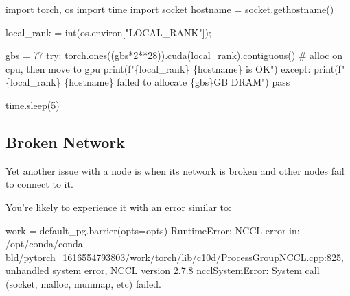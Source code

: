 \documentclass[
]{report}
\newenvironment{Shaded}{\begin{snugshade}}{\end{snugshade}}
\newcommand{\BuiltInTok}[1]{\textcolor[rgb]{0.00,0.23,0.31}{#1}}
\newcommand{\CommentTok}[1]{\textcolor[rgb]{0.37,0.37,0.37}{#1}}
\newcommand{\ControlFlowTok}[1]{\textcolor[rgb]{0.00,0.23,0.31}{#1}}
\newcommand{\DecValTok}[1]{\textcolor[rgb]{0.68,0.00,0.00}{#1}}
\newcommand{\ErrorTok}[1]{\textcolor[rgb]{0.68,0.00,0.00}{#1}}
\newcommand{\ExtensionTok}[1]{\textcolor[rgb]{0.00,0.23,0.31}{#1}}
\newcommand{\ImportTok}[1]{\textcolor[rgb]{0.00,0.46,0.62}{#1}}
\newcommand{\KeywordTok}[1]{\textcolor[rgb]{0.00,0.23,0.31}{#1}}
\newcommand{\NormalTok}[1]{\textcolor[rgb]{0.00,0.23,0.31}{#1}}
\newcommand{\OperatorTok}[1]{\textcolor[rgb]{0.37,0.37,0.37}{#1}}
\newcommand{\SpecialCharTok}[1]{\textcolor[rgb]{0.37,0.37,0.37}{#1}}
\newcommand{\SpecialStringTok}[1]{\textcolor[rgb]{0.13,0.47,0.30}{#1}}
\newcommand{\StringTok}[1]{\textcolor[rgb]{0.13,0.47,0.30}{#1}}
\newcommand{\VariableTok}[1]{\textcolor[rgb]{0.07,0.07,0.07}{#1}}
\begin{document}
\begin{Shaded}
\begin{Highlighting}[]
\ImportTok{import}\NormalTok{ torch, os}
\ImportTok{import}\NormalTok{ time}
\ImportTok{import}\NormalTok{ socket}
\NormalTok{hostname }\OperatorTok{=}\NormalTok{ socket.gethostname()}

\NormalTok{local\_rank }\OperatorTok{=} \BuiltInTok{int}\NormalTok{(os.environ[}\StringTok{"LOCAL\_RANK"}\NormalTok{])}\OperatorTok{;}

\NormalTok{gbs }\OperatorTok{=} \DecValTok{77}
\ControlFlowTok{try}\NormalTok{:}
\NormalTok{    torch.ones((gbs}\OperatorTok{*}\DecValTok{2}\OperatorTok{**}\DecValTok{28}\NormalTok{)).cuda(local\_rank).contiguous() }\CommentTok{\# alloc on cpu, then move to gpu}
    \BuiltInTok{print}\NormalTok{(}\SpecialStringTok{f"}\SpecialCharTok{\{}\NormalTok{local\_rank}\SpecialCharTok{\}}\SpecialStringTok{ }\SpecialCharTok{\{}\NormalTok{hostname}\SpecialCharTok{\}}\SpecialStringTok{ is OK"}\NormalTok{)}
\ControlFlowTok{except}\NormalTok{:}
    \BuiltInTok{print}\NormalTok{(}\SpecialStringTok{f"}\SpecialCharTok{\{}\NormalTok{local\_rank}\SpecialCharTok{\}}\SpecialStringTok{ }\SpecialCharTok{\{}\NormalTok{hostname}\SpecialCharTok{\}}\SpecialStringTok{ failed to allocate }\SpecialCharTok{\{}\NormalTok{gbs}\SpecialCharTok{\}}\SpecialStringTok{GB DRAM"}\NormalTok{)}
    \ControlFlowTok{pass}

\NormalTok{time.sleep(}\DecValTok{5}\NormalTok{)}
\end{Highlighting}
\end{Shaded}

\subsection{Broken Network}\label{broken-network}

Yet another issue with a node is when its network is broken and other
nodes fail to connect to it.

You're likely to experience it with an error similar to:

\begin{Shaded}
\begin{Highlighting}[]
\ExtensionTok{work}\NormalTok{ = default\_pg.barrier}\ErrorTok{(}\VariableTok{opts}\OperatorTok{=}\NormalTok{opts}\KeywordTok{)}
\ExtensionTok{RuntimeError:}\NormalTok{ NCCL error in: /opt/conda/conda{-}bld/pytorch\_1616554793803/work/torch/lib/c10d/ProcessGroupNCCL.cpp:825, unhandled system error, NCCL version 2.7.8}
\ExtensionTok{ncclSystemError:}\NormalTok{ System call }\ErrorTok{(}\ExtensionTok{socket,}\NormalTok{ malloc, munmap, etc}\KeywordTok{)} \ExtensionTok{failed.}
\end{Highlighting}
\end{Shaded}
\end{document}
